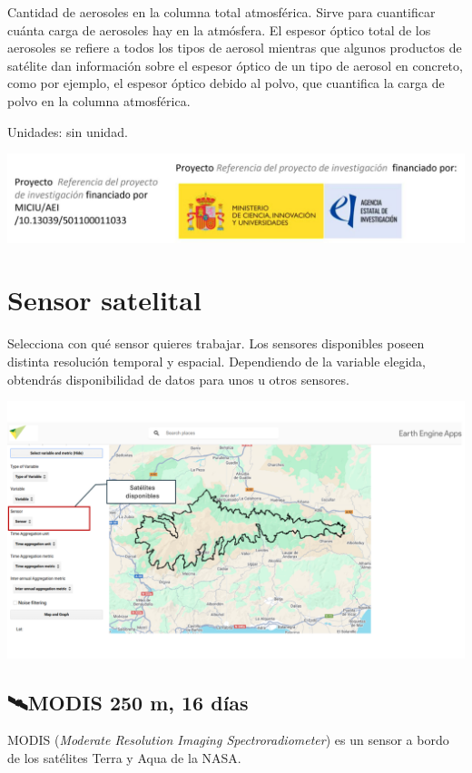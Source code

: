 \documentclass[
]{book}
\begin{document}
Cantidad de aerosoles en la columna total atmosférica. Sirve para cuantificar cuánta carga de aerosoles hay en la atmósfera. El espesor óptico total de los aerosoles se refiere a todos los tipos de aerosol mientras que algunos productos de satélite dan información sobre el espesor óptico de un tipo de aerosol en concreto, como por ejemplo, el espesor óptico debido al polvo, que cuantifica la carga de polvo en la columna atmosférica.

Unidades: sin unidad.

\includegraphics{assets/logo.jpeg}

\chapter{Sensor satelital}\label{sensor}

Selecciona con qué sensor quieres trabajar. Los sensores disponibles poseen distinta resolución temporal y espacial. Dependiendo de la variable elegida, obtendrás disponibilidad de datos para unos u otros sensores.

\includegraphics{assets/sensor_es.png}

\section{\texorpdfstring{\textbf{🛰️MODIS 250 m, 16 días}}{🛰️MODIS 250 m, 16 días}}\label{modis-250-m-16-duxedas}

MODIS (\emph{Moderate Resolution Imaging Spectroradiometer}) es un sensor a bordo de los satélites Terra y Aqua de la NASA.
\end{document}
